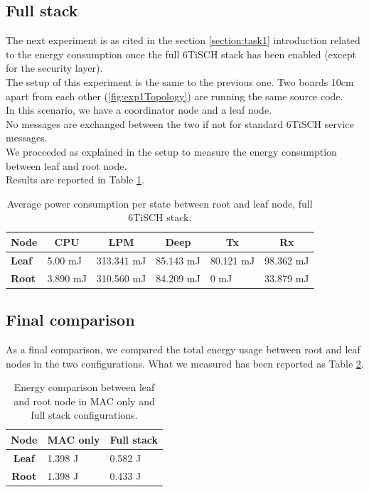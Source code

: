 \documentclass[conference]{IEEEtran}
\begin{document}
\subsection{Full stack}
The next experiment is as cited in the section \ref{section:task1} introduction related to the energy consumption once the full 6TiSCH stack has been enabled (except for the security layer).\\
The setup of this experiment is the same to the previous one.
Two boards 10cm apart from each other (\ref{fig:exp1Topology}) are running the same source code.\\
In this scenario, we have a coordinator node and a leaf node.\\
No messages are exchanged between the two if not for standard 6TiSCH service messages.\\
We proceeded as explained in the setup to measure the energy consumption between leaf and root node.\\
Results are reported in Table \ref{tab:FullStack}.
\begin{table}[h]
	\centering
	\begin{tabular}{llllll}
		\hline
		\textbf{Node} &
		\multicolumn{1}{c}{\textbf{CPU}} &
		\multicolumn{1}{c}{\textbf{LPM}} &
		\multicolumn{1}{c}{\textbf{Deep}} &
		\multicolumn{1}{c}{\textbf{Tx}} &
		\multicolumn{1}{c}{\textbf{Rx}} \\ \hline
		\textbf{Leaf} &
		5.00 mJ &
		313.341 mJ &
		85.143 mJ &
		80.121 mJ &
		98.362 mJ \\
		\textbf{Root} &
		3.890 mJ &
		310.560 mJ &
		84.209 mJ &
		0 mJ &
		33.879 mJ \\ \hline
	\end{tabular}
	\caption{Average power consumption per state between root and leaf node, full 6TiSCH  stack.}
	\label{tab:FullStack}
\end{table}
\subsection{Final comparison}
As a final comparison, we compared the total energy usage between root and leaf nodes in the two configurations.
What we measured has been reported as Table \ref{tab:exp1Comparison}.
\begin{table}[h]
	\centering
	\begin{tabular}{cll}
		\hline
		\textbf{Node} & \multicolumn{1}{c}{\textbf{MAC only}} & \multicolumn{1}{c}{\textbf{Full stack}} \\ \hline
		\textbf{Leaf} & 1.398 J                                & 0.582 J                                  \\
		\textbf{Root} & 1.398 J                                & 0.433 J                                  \\ \hline
	\end{tabular}
	\caption{Energy comparison between leaf and root node in MAC only and full stack configurations.}
	\label{tab:exp1Comparison}
\end{table}
\end{document}
